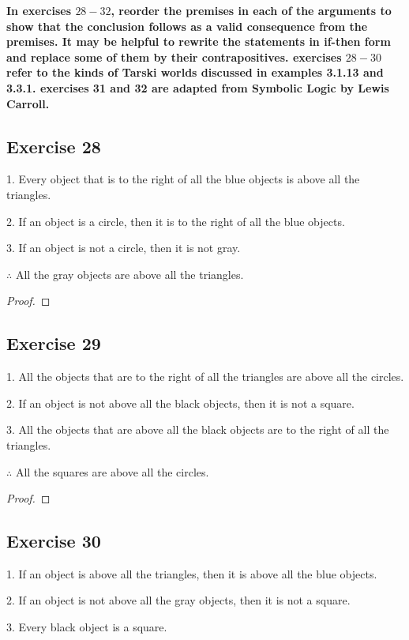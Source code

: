 \documentclass[14pt]{extarticle}
\begin{document}
{\bf \color{cyan} In exercises $28-32$, reorder the premises in each of the arguments to show that the conclusion follows as a valid consequence from the premises. It may be helpful to rewrite the statements in if-then form and replace some of them by their contrapositives. exercises $28-30$ refer to the kinds of Tarski worlds discussed in examples 3.1.13 and 3.3.1. exercises 31 and 32 are adapted from Symbolic Logic by Lewis Carroll.}

\subsection{Exercise 28}
1. Every object that is to the right of all the blue objects is above all the triangles.

2. If an object is a circle, then it is to the right of all the blue objects.

3. If an object is not a circle, then it is not gray. 

$\therefore$ All the gray objects are above all the triangles.

\begin{proof}

\end{proof}

\subsection{Exercise 29}
1. All the objects that are to the right of all the triangles are above all the circles.

2. If an object is not above all the black objects, then it is not a square.

3. All the objects that are above all the black objects are to the right of all the triangles.

$\therefore$ All the squares are above all the circles.

\begin{proof}

\end{proof}

\subsection{Exercise 30}
1. If an object is above all the triangles, then it is above all the blue objects.

2. If an object is not above all the gray objects, then it is not a square.

3. Every black object is a square.
\end{document}
